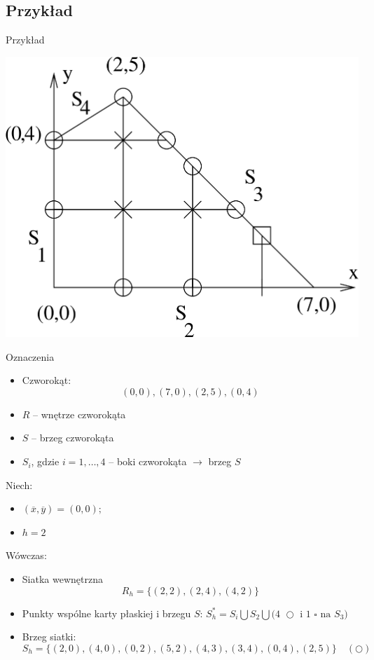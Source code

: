 \subsection{Przykład}

\begin{frame}{Przykład}
  \centerline{\includegraphics[height = 0.85 \textheight]{img/23/przyklad}}
\end{frame}

\begin{frame}
  \begin{block}{Oznaczenia}
    \begin{itemize}
      \item Czworokąt:
            $$(0,0), (7,0), (2,5), (0,4)$$
      \item $R$ -- wnętrze czworokąta
      \item $S$ -- brzeg czworokąta
      \item $S_i$, gdzie $i=1,\dots , 4$ -- boki czworokąta $\rightarrow$ brzeg $S$
    \end{itemize}
  \end{block}
\end{frame}

\begin{frame}
  Niech:
  \begin{itemize}
    \item $(\overline{x},\overline{y}) = (0,0);$
    \item $h=2$
  \end{itemize}

  Wówczas:
  \begin{itemize}
    \item Siatka wewnętrzna \begin{equation}R_h = \{(2,2),(2,4),(4,2)\} \end{equation}
    \item Punkty wspólne karty płaskiej i brzegu $S$: $S_h^* = S_i \bigcup S_2 \bigcup \text{(4 $\bigcirc$ i 1 $\square$ na $S_3$)}$ %
    \item Brzeg siatki:$$S_h = \{ (2,0),(4,0),(0,2),(5,2),(4,3),(3,4),(0,4),(2,5) \}\quad (\bigcirc)$$
  \end{itemize}
\end{frame}

